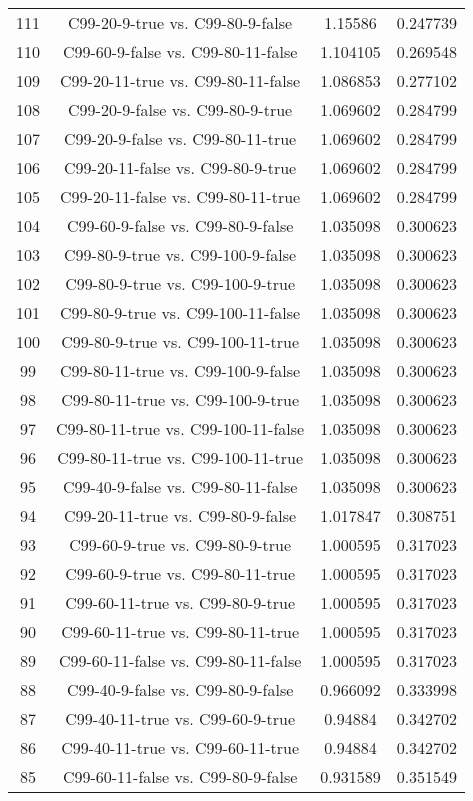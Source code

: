 \documentclass[a4paper,10pt]{article}
\begin{document}
\begin{landscape}
\begin{table}[!htp]
\begin{tabular}{cccc}
111&C99-20-9-true vs. C99-80-9-false&1.15586&0.247739\\
110&C99-60-9-false vs. C99-80-11-false&1.104105&0.269548\\
109&C99-20-11-true vs. C99-80-11-false&1.086853&0.277102\\
108&C99-20-9-false vs. C99-80-9-true&1.069602&0.284799\\
107&C99-20-9-false vs. C99-80-11-true&1.069602&0.284799\\
106&C99-20-11-false vs. C99-80-9-true&1.069602&0.284799\\
105&C99-20-11-false vs. C99-80-11-true&1.069602&0.284799\\
104&C99-60-9-false vs. C99-80-9-false&1.035098&0.300623\\
103&C99-80-9-true vs. C99-100-9-false&1.035098&0.300623\\
102&C99-80-9-true vs. C99-100-9-true&1.035098&0.300623\\
101&C99-80-9-true vs. C99-100-11-false&1.035098&0.300623\\
100&C99-80-9-true vs. C99-100-11-true&1.035098&0.300623\\
99&C99-80-11-true vs. C99-100-9-false&1.035098&0.300623\\
98&C99-80-11-true vs. C99-100-9-true&1.035098&0.300623\\
97&C99-80-11-true vs. C99-100-11-false&1.035098&0.300623\\
96&C99-80-11-true vs. C99-100-11-true&1.035098&0.300623\\
95&C99-40-9-false vs. C99-80-11-false&1.035098&0.300623\\
94&C99-20-11-true vs. C99-80-9-false&1.017847&0.308751\\
93&C99-60-9-true vs. C99-80-9-true&1.000595&0.317023\\
92&C99-60-9-true vs. C99-80-11-true&1.000595&0.317023\\
91&C99-60-11-true vs. C99-80-9-true&1.000595&0.317023\\
90&C99-60-11-true vs. C99-80-11-true&1.000595&0.317023\\
89&C99-60-11-false vs. C99-80-11-false&1.000595&0.317023\\
88&C99-40-9-false vs. C99-80-9-false&0.966092&0.333998\\
87&C99-40-11-true vs. C99-60-9-true&0.94884&0.342702\\
86&C99-40-11-true vs. C99-60-11-true&0.94884&0.342702\\
85&C99-60-11-false vs. C99-80-9-false&0.931589&0.351549\\

\end{tabular}
\end{table}
\end{landscape}
\end{document}
